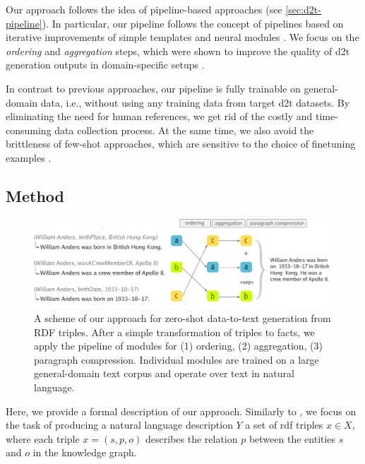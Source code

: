 Our approach follows the idea of pipeline-based approaches (see \autoref{sec:d2t-pipeline}). In particular, our pipeline follows the concept of pipelines based on iterative improvements of simple templates  \cite{laha2020scalable} and neural modules \cite{ferreiraNeuralDatatotextGeneration2019}. We focus on the \emph{ordering} and \emph{aggregation} steps, which were shown to improve the quality of \ac{d2t} generation outputs in domain-specific setups \cite{moryossef2019improving,moryossef2019step,trisedyaSentenceGenerationEntity2020,su2021plan}.

In contrast to previous approaches, our pipeline is fully trainable on general-domain data, i.e., without using any training data from target \ac{d2t} datasets. By eliminating the need for human references, we get rid of the costly and time-consuming data collection process. At the same time, we also avoid the brittleness of few-shot approaches, which are sensitive to the choice of finetuning examples \cite{chenFewShotNLGPreTrained2019,suFewShotTabletoTextGeneration2021,changSelectGenChallengeFinding2021}.

\subsection{Method}
\label{sec:pipeline:method}
\begin{figure}[t]
    \centering
    \includegraphics[width=\textwidth]{img/zeroshot_pipeline.pdf}
    \caption[Zero-shot data-to-text generation.]{A scheme of our approach for zero-shot data-to-text generation from RDF triples. After a simple transformation of triples to facts, we apply the pipeline of modules for (1) ordering, (2) aggregation, (3) paragraph compression. Individual modules are trained on a large general-domain text corpus and operate over text in natural language.}\label{fig:zeroshot:pipeline}
\end{figure}
Here, we provide a formal description of our approach. Similarly to , we focus on the task of producing a natural language description $Y$ a set of \ac{rdf} triples $x \in X$, where each triple $x = (s, p, o)$ describes the relation $p$ between the entities $s$ and $o$ in the knowledge graph.

